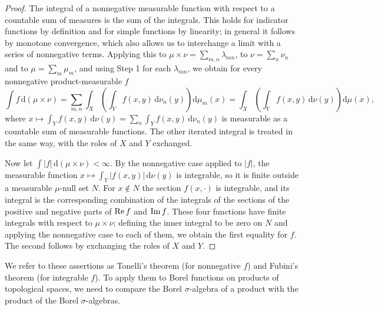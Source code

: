 \begin{proof}
The integral of a nonnegative measurable function with respect to a countable sum of measures is the sum of the integrals. This holds for indicator functions by definition and for simple functions by linearity; in general it follows by monotone convergence, which also allows us to interchange a limit with a series of nonnegative terms. Applying this to $\mu\times\nu=\sum_{m,n}\lambda_{mn}$, to $\nu=\sum_n\nu_n$ and to $\mu=\sum_m\mu_m$, and using Step 1 for each $\lambda_{mn}$, we obtain for every nonnegative product-measurable $f$
\[
 \int f\,\mathrm d(\mu\times\nu)=\sum_{m,n}\int_X\left(\int_Yf(x,y)\,\mathrm d\nu_n(y)\right)\mathrm d\mu_m(x)=\int_X\left(\int_Yf(x,y)\,\mathrm d\nu(y)\right)\mathrm d\mu(x),
\]
where $x\mapsto\int_Yf(x,y)\,\mathrm d\nu(y)=\sum_n\int_Yf(x,y)\,\mathrm d\nu_n(y)$ is measurable as a countable sum of measurable functions. The other iterated integral is treated in the same way, with the roles of $X$ and $Y$ exchanged.

Now let $\int|f|\,\mathrm d(\mu\times\nu)<\infty$. By the nonnegative case applied to $|f|$, the measurable function $x\mapsto\int_Y|f(x,y)|\,\mathrm d\nu(y)$ is integrable, so it is finite outside a measurable $\mu$-null set $N$. For $x\notin N$ the section $f(x,\cdot)$ is integrable, and its integral is the corresponding combination of the integrals of the sections of the positive and negative parts of $\operatorname{Re} f$ and $\operatorname{Im} f$. These four functions have finite integrals with respect to $\mu\times\nu$; defining the inner integral to be zero on $N$ and applying the nonnegative case to each of them, we obtain the first equality for $f$. The second follows by exchanging the roles of $X$ and $Y$.
\end{proof}

We refer to these assertions as Tonelli's theorem (for nonnegative $f$) and Fubini's theorem (for integrable $f$). To apply them to Borel functions on products of topological spaces, we need to compare the Borel $\sigma$-algebra of a product with the product of the Borel $\sigma$-algebras.

